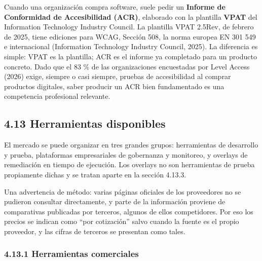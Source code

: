 \documentclass[10pt,letterpaper,onecolumn]{IEEEtran}
\begin{document}
Cuando una organización compra software, suele pedir un \textbf{Informe de Conformidad de Accesibilidad (ACR)}, elaborado con la plantilla \textbf{VPAT} del Information Technology Industry Council. La plantilla VPAT 2.5Rev, de febrero de 2025, tiene ediciones para WCAG, Sección 508, la norma europea EN 301 549 e internacional (Information Technology Industry Council, 2025). La diferencia es simple: VPAT es la plantilla; ACR es el informe ya completado para un producto concreto. Dado que el 83 \% de las organizaciones encuestadas por Level Access (2026) exige, siempre o casi siempre, pruebas de accesibilidad al comprar productos digitales, saber producir un ACR bien fundamentado es una competencia profesional relevante.

\subsection{4.13 Herramientas disponibles}\label{herramientas-disponibles}

El mercado se puede organizar en tres grandes grupos: herramientas de desarrollo y prueba, plataformas empresariales de gobernanza y monitoreo, y overlays de remediación en tiempo de ejecución. Los overlays no son herramientas de prueba propiamente dichas y se tratan aparte en la sección 4.13.3.

Una advertencia de método: varias páginas oficiales de los proveedores no se pudieron consultar directamente, y parte de la información proviene de comparativas publicadas por terceros, algunos de ellos competidores. Por eso los precios se indican como ``por cotización'' salvo cuando la fuente es el propio proveedor, y las cifras de terceros se presentan como tales.

\subsubsection{4.13.1 Herramientas comerciales}\label{herramientas-comerciales}
\end{document}
